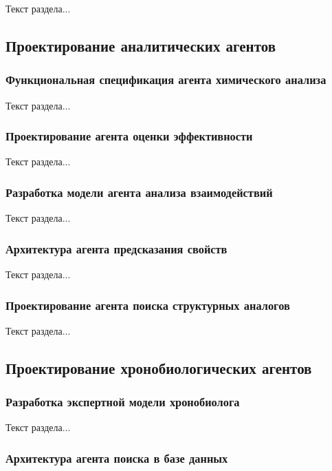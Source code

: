 Текст раздела...

\subsection{Проектирование аналитических агентов}

\subsubsection{Функциональная спецификация агента химического анализа}

Текст раздела...

\subsubsection{Проектирование агента оценки эффективности}

Текст раздела...

\subsubsection{Разработка модели агента анализа взаимодействий}

Текст раздела...

\subsubsection{Архитектура агента предсказания свойств}

Текст раздела...

\subsubsection{Проектирование агента поиска структурных аналогов}

Текст раздела...

\subsection{Проектирование хронобиологических агентов}

\subsubsection{Разработка экспертной модели хронобиолога}

Текст раздела...

\subsubsection{Архитектура агента поиска в базе данных}

